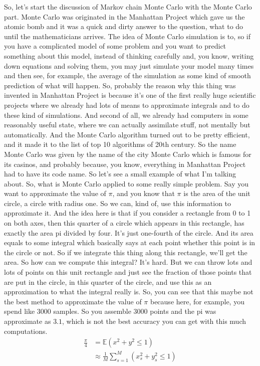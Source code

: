 \documentclass[11pt, oneside, reqno]{amsart}
\numberwithin{equation}{section}
\theoremstyle{plain}%
\theoremstyle{definition}
\theoremstyle{remark}
\newcommand{\E}{\mathbb{E}}
\begin{document}
So, let's start the discussion of Markov chain Monte Carlo with the Monte Carlo part. Monte Carlo was originated in the Manhattan Project which gave us the atomic bomb and it was a quick and dirty answer to the question, what to do until the mathematicians arrives. The idea of Monte Carlo simulation is to, so if you have a complicated model of some problem and you want to predict something about this model, instead of thinking carefully and, you know, writing down equations and solving them, you may just simulate your model many times and then see, for example, the average of the simulation as some kind of smooth prediction of what will happen. So, probably the reason why this thing was invented in Manhattan Project is because it's one of the first really huge scientific projects where we already had lots of means to approximate integrals and to do these kind of simulations. And second of all, we already had computers in some reasonably useful state, where we can actually assimilate stuff, not mentally but automatically. And the Monte Carlo algorithm turned out to be pretty efficient, and it made it to the list of top 10 algorithms of 20th century. So the name Monte Carlo was given by the name of the city Monte Carlo which is famous for its casinos, and probably because, you know, everything in Manhattan Project had to have its code name. So let's see a small example of what I'm talking about. So, what is Monte Carlo applied to some really simple problem. Say you want to approximate the value of $\pi$, and you know that $\pi$ is the area of the unit circle, a circle with radius one. So we can, kind of, use this information to approximate it. And the idea here is that if you consider a rectangle from 0 to 1 on both axes, then this quarter of a circle which appears in this rectangle, has exactly the area pi divided by four. It's just one-fourth of the circle. And its area equals to some integral which basically says at each point whether this point is in the circle or not. So if we integrate this thing along this rectangle, we'll get the area. 
So how can we compute this integral? It's hard. But we can throw lots and lots of points on this unit rectangle and just see the fraction of those points that are put in the circle, in this quarter of the circle, and use this as an approximation to what the integral really is. So, you can see that this maybe not the best method to approximate the value of $\pi$ because here, for example, you spend like $3000$ samples. So you assemble $3000$ points and the pi was approximate as $3.1$, which is not the best accuracy you can get with this much computations. 
\begin{align*}
	\frac{\pi}{4}&=\E(x^2+y^2\le 1)\\
	&\approx\frac{1}{M}\sum^M_{s=1}(x^2_s+y^2_s\le 1)
\end{align*}
\end{document}
